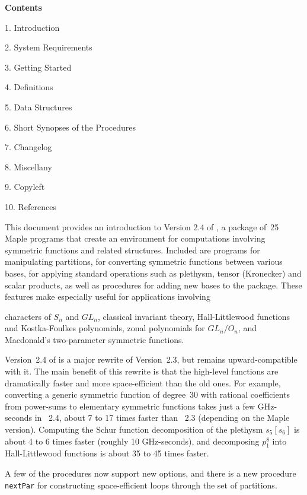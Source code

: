 \centerline{\bf Contents}
\item{1.} Introduction
\item{2.} System Requirements
\item{3.} Getting Started
\item{4.} Definitions
\item{5.} Data Structures
\item{6.} Short Synopses of the Procedures
\item{7.} Changelog
\item{8.} Miscellany
\item{9.} Copyleft
\item{10.} References

This document provides an introduction to Version 2.4 of \SF, a package
of~25 Maple programs that create an environment for computations involving
symmetric functions and related structures. Included are programs for
manipulating partitions, for converting symmetric functions between
various bases, for applying standard operations such as plethysm, tensor
(Kronecker) and scalar products, as well as procedures for adding
new bases to the package. These features make \SF{} especially useful
for applications involving

\bitem characters of $S_n$ and $GL_n$,
\bitem classical invariant theory,
\bitem Hall-Littlewood functions and Kostka-Foulkes polynomials,
\bitem zonal polynomials for $GL_n/O_n$, and
\bitem Macdonald's two-parameter symmetric functions.

Version~2.4 of \SF{} is a major rewrite of Version~2.3, but remains
upward-compatible with it. The main benefit of this rewrite is that
the high-level functions are dramatically faster and more
space-efficient than the old ones. For example, converting a generic
symmetric function of degree~30 with rational coefficients from
power-sums to elementary symmetric functions takes just a few
GHz-seconds in \SF~2.4, about 7 to 17 times faster than \SF~2.3
(depending on the Maple version). Computing the Schur function
decomposition of the plethysm $s_5[s_6]$ is about 4 to 6 times faster
(roughly 10 GHz-seconds), and decomposing $p_1^8$ into Hall-Littlewood
functions is about 35 to 45 times faster.

A few of the procedures now support new options, and there is a
new procedure {\tt nextPar} for constructing space-efficient loops
through the set of partitions.


